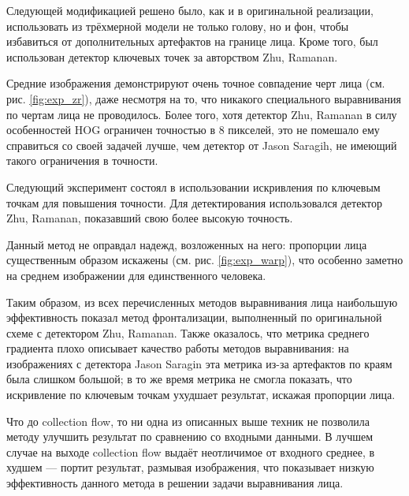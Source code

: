 Следующей модификацией решено было, как и в оригинальной реализации, использовать из трёхмерной модели не только голову, но и фон, чтобы избавиться от дополнительных артефактов на границе лица. Кроме того, был использован детектор ключевых точек за авторством Zhu, Ramanan.

Средние изображения демонстрируют очень точное совпадение черт лица (см. рис. \ref{fig:exp_zr}), даже несмотря на то, что никакого специального выравнивания по чертам лица не проводилось. Более того, хотя детектор Zhu, Ramanan в силу особенностей HOG ограничен точностью в 8 пикселей, это не помешало ему справиться со своей задачей лучше, чем детектор от Jason Saragih, не имеющий такого ограничения в точности.

Следующий эксперимент состоял в использовании искривления по ключевым точкам для повышения точности. Для детектирования использовался детектор Zhu, Ramanan, показавший свою более высокую точность.

Данный метод не оправдал надежд, возложенных на него: пропорции лица существенным образом искажены (см. рис. \ref{fig:exp_warp}), что особенно заметно на среднем изображении для единственного человека.

Таким образом, из всех перечисленных методов выравнивания лица наибольшую эффективность показал метод фронтализации, выполненный по оригинальной схеме с детектором Zhu, Ramanan. Также оказалось, что метрика среднего градиента плохо описывает качество работы методов выравнивания: на изображениях с детектора Jason Saragin эта метрика из-за артефактов по краям была слишком большой; в то же время метрика не смогла показать, что искривление по ключевым точкам ухудшает результат, искажая пропорции лица.

Что до collection flow, то ни одна из описанных выше техник не позволила методу улучшить результат по сравнению со входными данными. В лучшем случае на выходе collection flow выдаёт неотличимое от входного среднее, в худшем --- портит результат, размывая изображения, что показывает низкую эффективность данного метода в решении задачи выравнивания лица.